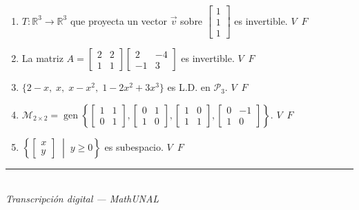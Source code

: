 \documentclass[11pt]{article}
\newcommand{\examfooter}{%
  \vfill
  \rule{\linewidth}{0.4pt}\\[1pt]
  {\scriptsize\textit{Transcripción digital --- MathUNAL}\hfill\textcolor{unalblue}{\textbf{\thepage}}}
}
\begin{document}
\begin{enumerate}[label=\alph*)]
\item $T:\mathbb{R}^3 \to \mathbb{R}^3$ que proyecta un vector $\vec{v}$ sobre $\begin{bmatrix}1\\1\\1\end{bmatrix}$ es invertible. \hfill \mbox{$\boxed{V}$ $\boxed{F}$}

\vspace{0.5cm}
\item La matriz $A = \begin{bmatrix}2&2\\1&1\end{bmatrix}\begin{bmatrix}2&-4\\-1&3\end{bmatrix}$ es invertible. \hfill \mbox{$\boxed{V}$ $\boxed{F}$}

\vspace{0.5cm}
\item $\{2-x,\; x,\; x-x^2,\; 1-2x^2+3x^3\}$ es L.D. en $\mathcal{P}_3$. \hfill \mbox{$\boxed{V}$ $\boxed{F}$}

\vspace{0.5cm}
\item $\mathcal{M}_{2\times 2} = \operatorname{gen}\left\{ \begin{bmatrix}1&1\\0&1\end{bmatrix}, \begin{bmatrix}0&1\\1&0\end{bmatrix}, \begin{bmatrix}1&0\\1&1\end{bmatrix}, \begin{bmatrix}0&-1\\1&0\end{bmatrix} \right\}$. \hfill \mbox{$\boxed{V}$ $\boxed{F}$}

\vspace{0.5cm}
\item $\left\{ \begin{bmatrix}x\\y\end{bmatrix} \;\middle|\; y \geq 0 \right\}$ es subespacio. \hfill \mbox{$\boxed{V}$ $\boxed{F}$}
\end{enumerate}

\examfooter
\newpage
\end{document}
